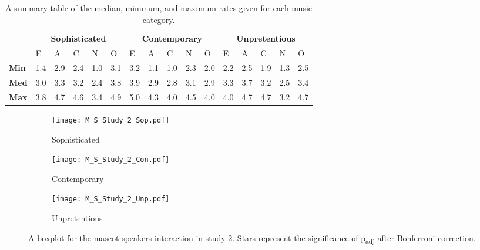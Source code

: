 \begin{table}[hbt!]
    \renewcommand{\arraystretch}{1}
    \begin{center}
        \begin{tabular}{p{}|
        p{}|p{}|p{}|p{}|p{}||
        p{}|p{}|p{}|p{}|p{}||
        p{}|p{}|p{}|p{}|p{}|}
            \cline{2-16}
            & \multicolumn{5}{c||}{\textbf{Sophisticated}} & \multicolumn{5}{c||}{\textbf{Contemporary}}
            & \multicolumn{5}{c|}{\textbf{Unpretentious}} \\
            \cline{2-16}
            & E & A & C & N & O & E & A & C & N & O & E & A & C & N & O     \\
            \cline{2-16}
            \textbf{Min}    & 1.4 & 2.9 & 2.4 & 1.0 & 3.1 & 3.2 & 1.1 & 1.0 & 2.3 & 2.0 & 2.2 & 2.5 & 1.9 & 1.3 & 2.5  \\
            \textbf{Med}    & 3.0 & 3.3 & 3.2 & 2.4 & 3.8 & 3.9 & 2.9 & 2.8 & 3.1 & 2.9 & 3.3 & 3.7 & 3.2 & 2.5 & 3.4   \\
            \textbf{Max}    & 3.8 & 4.7 & 4.6 & 3.4 & 4.9 & 5.0 & 4.3 & 4.0 & 4.5 & 4.0 & 4.0 & 4.7 & 4.7 & 3.2 & 4.7 \\
            \cline{2-16}
        \end{tabular}
        \caption{A summary table of the median, minimum, and maximum rates given for each music category.}
        \label{table:medianMS2}
    \end{center}
\end{table}
\begin{figure}[hbt!]
    \centering
    \begin{subfigure}{.45\textwidth}
        \centering
        \texttt{[image: M\_S\_Study\_2\_Sop.pdf]}
        \caption{Sophisticated}
        \label{fig:sub1}
    \end{subfigure}\hfill%
    \begin{subfigure}{.45\textwidth}
        \centering
        \texttt{[image: M\_S\_Study\_2\_Con.pdf]}
        \caption{Contemporary}
        \label{fig:sub2}
    \end{subfigure}\hfill
    \begin{subfigure}{.45\textwidth}
        \centering
        \texttt{[image: M\_S\_Study\_2\_Unp.pdf]}
        \caption{Unpretentious}
        \label{fig:sub1}
    \end{subfigure}\hfill%
    \caption{A boxplot for the mascot-speakers interaction in study-2.
    Stars represent the significance of p\textsubscript{adj} after Bonferroni correction.}
    \label{fig:MS2}
\end{figure}
